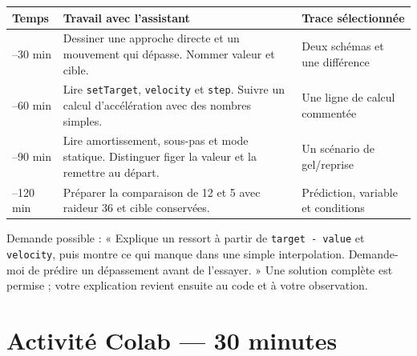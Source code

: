 \documentclass[
  canadien,
  11pt,
  a4paper,
]{report}
\newcounter{none} %
\begin{document}
{\def\LTcaptype{none} %
\begin{longtable}[]{@{}
  >{\raggedright\arraybackslash}p{}
  >{\raggedright\arraybackslash}p{}
  >{\raggedright\arraybackslash}p{}@{}}
\toprule\noalign{}
\begin{minipage}[b]{\linewidth}\raggedright
Temps
\end{minipage} & \begin{minipage}[b]{\linewidth}\raggedright
Travail avec l'assistant
\end{minipage} & \begin{minipage}[b]{\linewidth}\raggedright
Trace sélectionnée
\end{minipage} \\
\midrule\noalign{}
\endhead
\bottomrule\noalign{}
\endlastfoot
0--30 min & Dessiner une approche directe et un mouvement qui dépasse.
Nommer valeur et cible. & Deux schémas et une différence \\
30--60 min & Lire \texttt{set\allowbreak{}Target}, \texttt{velocity} et
\texttt{step}. Suivre un calcul d'accélération avec des nombres simples.
& Une ligne de calcul commentée \\
60--90 min & Lire amortissement, sous-pas et mode statique. Distinguer
figer la valeur et la remettre au départ. & Un scénario de
gel/reprise \\
90--120 min & Préparer la comparaison de 12 et 5 avec raideur 36 et
cible conservées. & Prédiction, variable et conditions \\
\end{longtable}
}

Demande possible : « Explique un ressort à partir de
\texttt{target\ -\ value} et \texttt{velocity}, puis montre ce qui
manque dans une simple interpolation. Demande-moi de prédire un
dépassement avant de l'essayer. » Une solution complète est permise ;
votre explication revient ensuite au code et à votre observation.

\section{Activité Colab --- 30
minutes}\label{activituxe9-colab-30-minutes-4}
\end{document}
